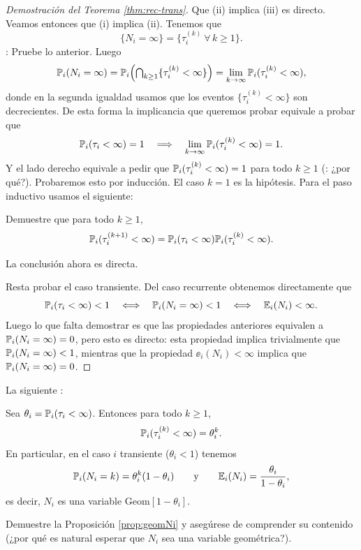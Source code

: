 \begin{proof}[Demostración del Teorema \ref{thm:rec-trans}]
Que (ii) implica (iii) es directo.
Veamos entonces que (i) implica (ii).
Tenemos que
\[\{N_i=\infty\}=\{\tau_i^{(k)}~\forall\,k\geq1\}.\]
\uexer: Pruebe lo anterior.
Luego
\[\mathbb{P}_i(N_i=\infty)=\mathbb{P}_i\Big({\textstyle\bigcap_{k\geq1}}\{\tau^{(k)}_i<\infty\}\Big)=\lim_{k\to\infty}\mathbb{P}_i(\tau^{(k)}_i<\infty),\]
donde en la segunda igualdad usamos que los eventos $\{\tau^{(k)}_i<\infty\}$ son decrecientes.
De esta forma la implicancia que queremos probar equivale a probar que 
\begin{equation}
\mathbb{P}_i(\tau_i<\infty)=1\quad\Longrightarrow\quad\lim_{k\to\infty}\mathbb{P}_i(\tau^{(k)}_i<\infty)=1.
\end{equation}
Y el lado derecho equivale a pedir que $\mathbb{P}_i(\tau^{(k)}_i<\infty)=1$ para todo $k\geq1$ (\uexers: ¿por qué?).
Probaremos esto por inducción.
El caso $k=1$ es la hipótesis.
Para el paso inductivo usamos el siguiente:
\begin{exer}
Demuestre que para todo $k\geq1$,
\[\mathbb{P}_i(\tau^{(k+1)}_i<\infty)=\mathbb{P}_i(\tau_i<\infty)\mathbb{P}_i(\tau^{(k)}_i<\infty).\]
\end{exer}
\noindent La conclusión ahora es directa.

Resta probar el caso transiente.
Del caso recurrente obtenemos directamente que
\[\mathbb{P}_i(\tau_i<\infty)<1\quad\Longleftrightarrow\quad\mathbb{P}_i(N_i=\infty)<1\quad\Longleftrightarrow\quad\mathbb{E}_i(N_i)<\infty.\]
Luego lo que falta demostrar es que las propiedades anteriores equivalen a $\mathbb{P}_i(N_i=\infty)=0$, pero esto es directo: esta propiedad implica trivialmente que $\mathbb{P}_i(N_i=\infty)<1$, mientras que la propiedad $\ee_i(N_i)<\infty$ implica que $\mathbb{P}_i(N_i=\infty)=0$.
\end{proof}

La siguiente :

\begin{prop}\label{prop:geomNi}
Sea $\theta_i=\mathbb{P}_i(\tau_i<\infty)$.
Entonces para todo $k\geq1$,
\[\mathbb{P}_i(\tau^{(k)}_i<\infty)=\theta_i^k.\]
En particular, en el caso $i$ transiente ($\theta_i<1$) tenemos
\[\mathbb{P}_i(N_i=k)=\theta_i^k(1-\theta_i)\qquad\text{y}\qquad\mathbb{E}_i(N_i)=\frac{\theta_i}{1-\theta_i},\]
es decir, $N_i$ es una variable Geom$[1-\theta_i]$.
\end{prop}

\begin{exer}
Demuestre la Proposición \ref{prop:geomNi} y asegúrese de comprender su contenido (¿por qué es natural esperar que $N_i$ sea una variable geométrica?).
\end{exer}

